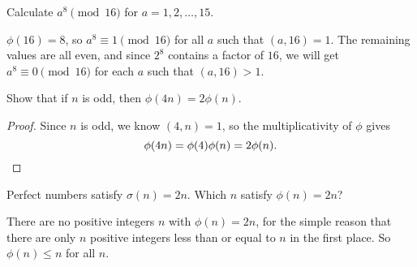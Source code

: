 Calculate $a^8\pmod{16}$ for $a = 1,2,\dots,15$.
\begin{solution}
  $\phi(16) = 8$, so $a^8\equiv1\pmod{16}$ for all $a$ such that
  $(a,16) = 1$. The remaining values are all even, and since $2^8$
  contains a factor of $16$, we will get $a^8\equiv0\pmod{16}$ for
  each $a$ such that $(a,16) > 1$.
\end{solution}

 Show that if $n$ is odd, then $\phi(4n) = 2\phi(n)$.
\begin{proof}
  Since $n$ is odd, we know $(4,n) = 1$, so the multiplicativity of
  $\phi$ gives
  \begin{equation*}
    \phi(4n) = \phi(4)\phi(n) = 2\phi(n). \qedhere
  \end{equation*}
\end{proof}

 Perfect numbers satisfy $\sigma(n) = 2n$. Which $n$ satisfy
$\phi(n) = 2n$?
\begin{solution}
  There are no positive integers $n$ with $\phi(n) = 2n$, for the
  simple reason that there are only $n$ positive integers less than or
  equal to $n$ in the first place. So $\phi(n) \leq n$ for all $n$.
\end{solution}

